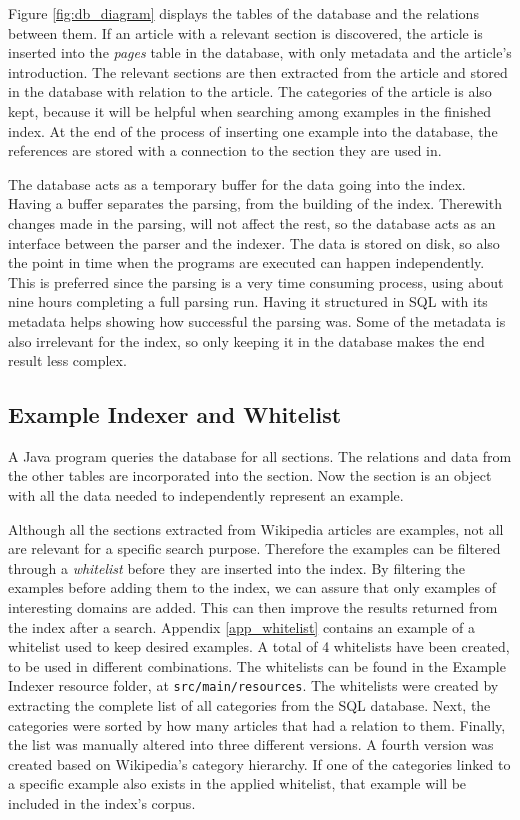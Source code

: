 Figure \ref{fig:db_diagram} displays the tables of the database and the relations between them. If an article with a relevant section is discovered, the article is inserted into the \textit{pages} table in the database, with only metadata and the article's introduction. The relevant sections are then extracted from the article and stored in the database with relation to the article. The categories of the article is also kept, because it will be helpful when searching among examples in the finished index. At the end of the process of inserting one example into the database, the references are stored with a connection to the section they are used in.

The database acts as a temporary buffer for the data going into the index. Having a buffer separates the parsing, from the building of the index. Therewith changes made in the parsing, will not affect the rest, so the database acts as an interface between the parser and the indexer. The data is stored on disk, so also the point in time when the programs are executed can happen independently.
This is preferred since the parsing is a very time consuming process, using about nine hours completing a full parsing run. Having it structured in SQL with its metadata helps showing how successful the parsing was. Some of the metadata is also irrelevant for the index, so only keeping it in the database  makes the end result less complex.


\subsection{Example Indexer and Whitelist} \label{imp_indexer}
A Java program queries the database for all sections. The relations and data from the other tables are incorporated into the section. Now the section is an object with all the data needed to independently represent an example.

Although all the sections extracted from Wikipedia articles are examples, not all are relevant for a specific search purpose. Therefore the examples can be filtered through a \textit{whitelist} before they are inserted into the index. By filtering the examples before adding them to the index, we can assure that only examples of interesting domains are added. This can then improve the results returned from the index after a search. Appendix \ref{app_whitelist} contains an example of a whitelist used to keep desired examples. A total of 4 whitelists have been created, to be used in different combinations. The whitelists can be found in the Example Indexer resource folder, at \texttt{src/main/resources}. The whitelists were created by extracting the complete list of all categories from the SQL database. Next, the categories were sorted by how many articles that had a relation to them. Finally, the list was manually altered into three different versions. A fourth version was created based on Wikipedia's category hierarchy. If one of the categories linked to a specific example also exists in the applied whitelist, that example will be included in the index's corpus.

